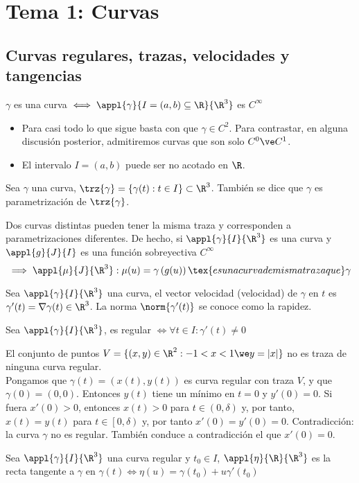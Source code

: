 \section{Tema 1: Curvas}

\subsection{Curvas regulares, trazas, velocidades y tangencias}
\begin{defn}[Curva]
	$\gamma$ es una curva $\iff \appl{\gamma}{I=(a,b)\subseteq\R}{\R^3}$ es $C^{\infty}$
	\begin{itemize}
		\item Para casi todo lo que sigue basta con que $\gamma \in C^2$. Para contrastar, en alguna discusión posterior, admitiremos curvas que son solo $C^0 \ve C^1$.
		\item El intervalo $I = (a,b)$ puede ser no acotado en $\R$.
	\end{itemize}
\end{defn}
\begin{defn}[Traza]
	Sea $\gamma$ una curva, $\trz{\gamma}=\{\gamma(t):t\in I\}\subset \R^3$. También se dice que $\gamma$ es parametrización de $\trz{\gamma}$.
\end{defn}

\begin{obs}
	Dos curvas distintas pueden tener la misma traza y corresponden a parametrizaciones diferentes. De hecho, si $\appl{\gamma}{I}{\R^3}$ es una curva y $\appl{g}{J}{I}$ es una función sobreyectiva $C^{\infty}$
	\[\implies \appl{\mu}{J}{\R^3} : \mu(u)=\gamma\left(g(u)\right)\tex{ es una curva de misma traza que } \gamma\]
\end{obs}
\begin{defn}
	Sea $\appl{\gamma}{I}{\R^3}$ una curva, el vector velocidad (velocidad) de $\gamma$ en $t$ es $\gamma'(t)=\nabla\gamma(t)\in \R^3$. La norma $\norm{\gamma'(t)}$ se conoce como la rapidez.
\end{defn}
\begin{defn}
	Sea $\appl{\gamma}{I}{\R^3}$, es regular $\iff \forall t \in I : \gamma'(t)\ne 0$
\end{defn}
\begin{ejem}
	El conjunto de puntos $V=\{(x, y)\in \R^2:-1<x<1\we y=|x|\}$ no es traza de ninguna curva regular.\\
	\indent Pongamos que $\gamma(t)=(x(t), y(t))$ es curva regular con traza $V$, y que $\gamma(0)=(0,0)$. Entonces $y(t)$ tiene un mínimo en $t = 0$ y $y'(0) = 0$. Si fuera $x'(0) > 0$, entonces $x(t) > 0$ para $t \in (0, \delta)$ y, por tanto, $x(t) =y(t)$ para $t \in \left[0, \delta\right)$ y, por tanto $x'(0) = y'(0) = 0$. Contradicción: la curva $\gamma$ no es regular. También conduce a contradicción el que $x'(0) = 0$.
\end{ejem}
\begin{defn}
	Sea $\appl{\gamma}{I}{\R^3}$ una curva regular y $t_0\in I$, $\appl{\eta}{\R}{\R^3}$ es la recta tangente a $\gamma$ en $\gamma(t) \iff \eta(u)=\gamma(t_0)+u\gamma'(t_0)$
\end{defn}


